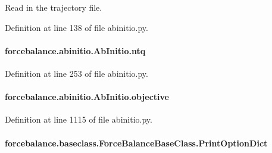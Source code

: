Read in the trajectory file. 



Definition at line 138 of file abinitio.\-py.

\hypertarget{classforcebalance_1_1abinitio_1_1AbInitio_af8a895f61ddea6b9ca2765ddbf309a75}{
\paragraph[{ntq}]{\setlength{\rightskip}{0pt plus 5cm}forcebalance.\-abinitio.\-Ab\-Initio.\-ntq\hspace{0.3cm}{\ttfamily [inherited]}}}\label{classforcebalance_1_1abinitio_1_1AbInitio_af8a895f61ddea6b9ca2765ddbf309a75}


Definition at line 253 of file abinitio.\-py.

\hypertarget{classforcebalance_1_1abinitio_1_1AbInitio_acbbd447b9f66bc4699992f3b64bb256d}{
\paragraph[{objective}]{\setlength{\rightskip}{0pt plus 5cm}forcebalance.\-abinitio.\-Ab\-Initio.\-objective\hspace{0.3cm}{\ttfamily [inherited]}}}\label{classforcebalance_1_1abinitio_1_1AbInitio_acbbd447b9f66bc4699992f3b64bb256d}


Definition at line 1115 of file abinitio.\-py.

\hypertarget{classforcebalance_1_1baseclass_1_1ForceBalanceBaseClass_a5c55e661e746d1a4443f4e0bc34ebe05}{
\paragraph[{Print\-Option\-Dict}]{\setlength{\rightskip}{0pt plus 5cm}forcebalance.\-baseclass.\-Force\-Balance\-Base\-Class.\-Print\-Option\-Dict\hspace{0.3cm}{\ttfamily [inherited]}}}\label{classforcebalance_1_1baseclass_1_1ForceBalanceBaseClass_a5c55e661e746d1a4443f4e0bc34ebe05}


